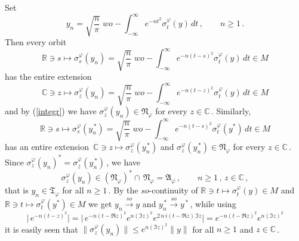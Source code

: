 \documentclass[reqno]{amsart}
\theoremstyle{definition}
\theoremstyle{remark}
\numberwithin{equation}{section}
\theoremstyle{plain}
\begin{document}
Set
\begin{equation*}
y_n=\sqrt{\frac n\pi}\; wo-\int_{-\infty}^\infty e^{-n t^2}
\sigma^\varphi_t(y)\, dt\, ,\qquad n\geq 1\, .
\end{equation*}
Then every orbit
\begin{equation*}
\mathbb R\ni s\longmapsto \sigma^\varphi_s (y_n) =
\sqrt{\frac n\pi}\; wo-\int_{-\infty}^\infty e^{-n (t-s)^2}
\sigma^\varphi_t (y)\, dt\in M
\end{equation*}
has the entire extension
\begin{equation}\label{compl.y_n}
\mathbb C\ni z\longmapsto \sigma^\varphi_z (y_n) =
\sqrt{\frac n\pi}\; wo-\int_{-\infty}^\infty e^{-n (t-z)^2}
\sigma^\varphi_t (y)\, dt\in M
\end{equation}
and by (\ref{integr}) we have $\sigma^\varphi_z (y_n)\in
\mathfrak N_\varphi$ for every $z\in\mathbb C\,$. Similarly,
\begin{equation*}
\mathbb R\ni s\longmapsto \sigma^\varphi_s (y_n^{\, *}) =
\sqrt{\frac n\pi}\; wo-\int_{-\infty}^\infty e^{-n (t-s)^2}
\sigma^\varphi_t (y^*)\, dt\in M
\end{equation*}
has an entire extension $\,\mathbb C\ni z\longmapsto
\sigma^\varphi_z (y_n^{\, *})$ and $\sigma^\varphi_z (y_n^{\, *})
\in\mathfrak N_\varphi$ for every $z\in\mathbb C\,$. Since
$\sigma^\varphi_z (y_n)^*=\sigma^\varphi_{\overline{z}}
(y_n^{\, *})\,$, we have
\begin{equation*}
\sigma^\varphi_z (y_n)\in (\mathfrak N_\varphi )^* \cap\,
\mathfrak N_\varphi =\mathfrak A_\varphi\, ,\qquad n\geq 1\, ,\,
z\in\mathbb C\, ,
\end{equation*}
that is $y_n\in\mathfrak T_\varphi$ for all $n\geq 1\,$. By the
$so$-continuity of $\mathbb R\ni t\longmapsto \sigma^\varphi_t
(y)\in M$
and $\mathbb R\ni t\longmapsto \sigma^\varphi_t (y^*)\in M$ we get
$y_n\overset{so}{\longrightarrow}y$ and $y_n^{\, *}
\overset{so}{\longrightarrow}y_{}^{\, *}\,$, while using
\begin{equation}\label{exp}
\big|\, e^{-n (t-z)^2}\big| =\big|\, e^{-n (t-\Re z )^2}
e^{n (\Im z )^2} e^{2\, n\, i (t-\Re z )\,\Im z}\big| =
e^{-n (t-\Re z )^2} e^{n (\Im z )^2}
\end{equation}
it is easily seen that $\| \sigma^\varphi_z (y_n )\|\leq
e^{n (\Im z)^2}\| y\|$ for all $n\geq 1$ and $z\in\mathbb C\,$.
\end{document}
